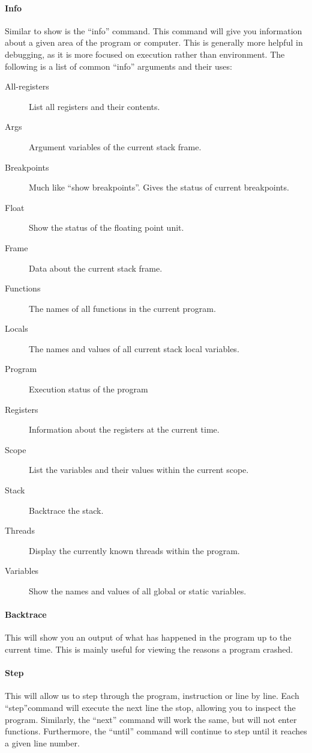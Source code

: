\documentclass[a4paper,11pt]{report}
\begin{document}
		\paragraph{Info}
		Similar to show is the ``info'' command. 
		This command will give you information about a given area of the program or computer. 
		This is generally more helpful in debugging, as it is more focused on execution rather than environment. 
		The following is a list of common ``info'' arguments and their uses:
		\begin{description}
			\item[All-registers] List all registers and their contents. 
			\item[Args] Argument variables of the current stack frame. 
			\item[Breakpoints] Much like ``show breakpoints''. Gives the status of current breakpoints. 
			\item[Float] Show the status of the floating point unit. 
			\item[Frame] Data about the current stack frame. 
			\item[Functions] The names of all functions in the current program. 
			\item[Locals] The names and values of all current stack local variables. 
			\item[Program] Execution status of the program
			\item[Registers] Information about the registers at the current time. 
			\item[Scope] List the variables and their values within the current scope. 
			\item[Stack] Backtrace the stack.
			\item[Threads] Display the currently known threads within the program. 
			\item[Variables] Show the names and values of all global or static variables. 
		\end{description}

		\paragraph{Backtrace}
		This will show you an output of what has happened in the program up to the current time. 
		This is mainly useful for viewing the reasons a program crashed. 

		\paragraph{Step}
		This will allow us to step through the program, instruction or line by line. 
		Each ``step''command will execute the next line the stop, allowing you to inspect the program. 
		Similarly, the ``next'' command will work the same, but will not enter functions. 
		Furthermore, the ``until'' command will continue to step until it reaches a given line number. 
\end{document}
